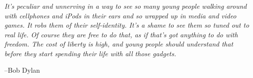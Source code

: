 \documentclass{exam}
\begin{document}
\else

\vspace{9 cm}

{\em It's peculiar and unnerving in a way to see so many young people walking around with cellphones and iPods in their ears
and so wrapped up in media and video games. It robs them of their self-identity. It's a shame to see them so tuned out
to real life. Of course they are free to do that, as if that's got anything to do with freedom. The cost of liberty is
high, and young people should understand that before they start spending their life with all those gadgets.}
\vspace{.2 cm}

\hspace{1 cm} --Bob Dylan

\fi
\end{document}
